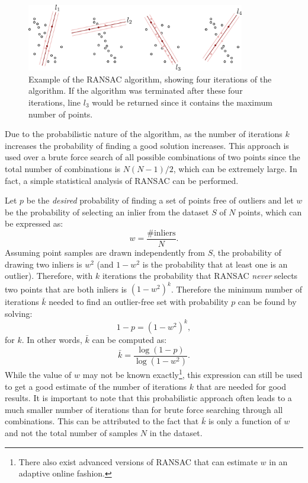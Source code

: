 \begin{figure}[ht]
  \centering
  \includegraphics[width=0.85\textwidth]{tex/figs/ch11_figs/ransac.png}
\caption{Example of the RANSAC algorithm, showing four iterations of the algorithm. If the algorithm was terminated after these four iterations, line $l_3$ would be returned since it contains the maximum number of points.}
\label{fig:ransac-working}
\end{figure}

Due to the probabilistic nature of the algorithm, as the number of iterations $k$ increases the probability of finding a good solution increases. This approach is used over a brute force search of all possible combinations of two points since the total number of combinations is $N(N-1)/2$, which can be extremely large. In fact, a simple statistical analysis of RANSAC can be performed.

Let $p$ be the \textit{desired} probability of finding a set of points free of outliers and let $w$ be the probability of selecting an inlier from the dataset $S$ of $N$ points, which can be expressed as:
\begin{equation*}
    w = \frac{\text{\# inliers}}{N}.
\end{equation*}
Assuming point samples are drawn independently from $S$, the probability of drawing two inliers is $w^2$ (and $1-w^2$ is the probability that at least one is an outlier). Therefore, with $k$ iterations the probability that RANSAC \textit{never} selects two points that are both inliers is $(1-w^2)^k$. Therefore the minimum number of iterations $\bar{k}$ needed to find an outlier-free set with probability $p$ can be found by solving:
\begin{equation*}
    1-p = (1-w^2)^k,
\end{equation*}
for $k$. In other words, $\bar{k}$ can be computed as:
\begin{equation*}
    \bar{k} = \frac{\log (1-p)}{\log (1-w^2)}.
    \label{eq:magic-k}
\end{equation*}
While the value of $w$ may not be known exactly\footnote{There also exist advanced versions of RANSAC that can estimate $w$ in an adaptive online fashion.}, this expression can still be used to get a good estimate of the number of iterations $k$ that are needed for good results. It is important to note that this probabilistic approach often leads to a much smaller number of iterations than for brute force searching through all combinations. This can be attributed to the fact that $\bar{k}$ is only a function of $w$ and not the total number of samples $N$ in the dataset. 

